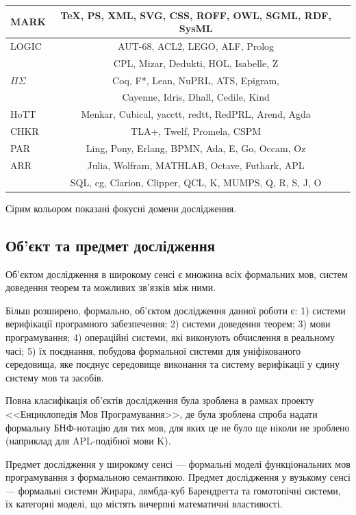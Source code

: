 \begin{table}[ht]
\begin{tabular}{lcc}
    \hline
       MARK & TeX, PS, XML, SVG, CSS, ROFF, OWL, SGML, RDF, SysML \\
    \hline
       LOGIC & AUT-68, ACL2, LEGO, ALF, Prolog \\
             & CPL, Mizar, Dedukti, HOL, Isabelle, Z \\
    \hline
\rowcolor{LightGray}
       $\Pi\Sigma$ & Coq, F*, Lean, NuPRL, ATS, Epigram, \\
\rowcolor{LightGray}
          & Cayenne, Idris, Dhall, Cedile, Kind \\
    \hline
\rowcolor{LightGray}
       HoTT & Menkar, Cubical, yacctt, redtt, RedPRL, Arend, Agda \\
    \hline
\rowcolor{LightGray25}
       CHKR & TLA+, Twelf, Promela, CSPM \\
    \hline
\rowcolor{LightGray}
       PAR & Ling, Pony, Erlang, BPMN, Ada, E, Go, Occam, Oz \\
    \hline
\rowcolor{LightGray}
       ARR & Julia, Wolfram, MATHLAB, Octave, Futhark, APL \\
\rowcolor{LightGray}
           & SQL, cg, Clarion, Clipper, QCL, K, MUMPS, Q, R, S, J, O \\
    \hline
  \end{tabular}
\small Сірим кольором показані фокусні домени дослідження.
\end{table}

\subsection{Об'єкт та предмет дослідження}
Об'єктом дослідження в широкому сенсі є множина
всіх формальних мов, систем доведення теорем та можливих зв'язків між ними.

Більш розширено, формально, об'єктом дослідження данної роботи є:
1) системи верифікації програмного забезпечення;
2) системи доведення теорем;
3) мови програмування;
4) операційні системи, які виконують обчислення в реальному часі;
5) їх поєднання, побудова формальної системи для
уніфікованого середовища, яке поєднує середовище
виконання та систему верифікації у єдину систему мов та засобів.

Повна класифікація об'єктів дослідження була зроблена в рамках проекту
<<Енциклопедія Мов Програмування>>, де була зроблена спроба надати
формальну БНФ-нотацію для тих мов, для яких це не було ще ніколи
не зроблено (наприклад для APL-подібної мови K).

Предмет дослідження у широкому сенсі --- формальні моделі функціональних
мов програмування з формальною семантикою. Предмет дослідження у
вузькому сенсі --- формальні системи Жирара, лямбда-куб Барендрегта
та гомотопічні системи, їх категорні моделі, що містять вичерпні
математичні властивості.

